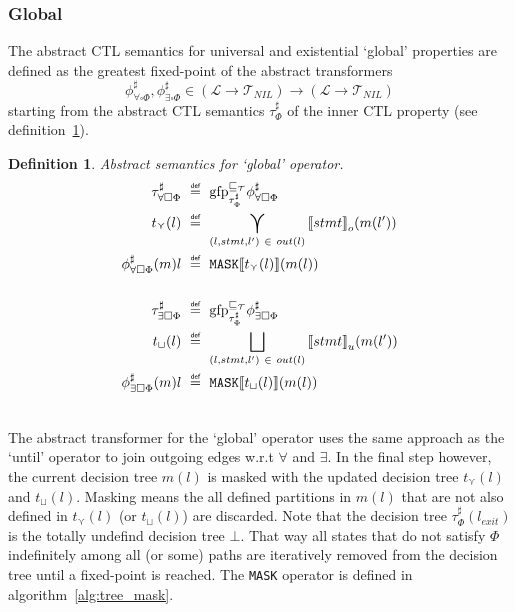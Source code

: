 \documentclass[11pt,a4paper,titlepage]{article}
\newtheorem{definition}{Definition}[section]
\newcommand\eqdef{\mathrel{\overset{\makebox[0pt]{\mbox{\normalfont\tiny\sffamily def}}}{=}}}
\begin{document}
\subsubsection*{Global}
The abstract CTL semantics for universal and existential `global' properties are defined as the greatest fixed-point of the abstract transformers
\[
    \phi^\sharp_{\forall\square\Phi}, \phi^\sharp_{\exists\square\Phi} 
\in (\mathcal{L} \rightarrow \mathcal{T}_{NIL}) \rightarrow (\mathcal{L} \rightarrow \mathcal{T}_{NIL})
\]
starting from the abstract CTL semantics $\tau^\sharp_\Phi$ of the inner CTL property (see definition~\ref{def:abstract_global_semantics}).

\begin{definition}\label{def:abstract_global_semantics}
    Abstract semantics for `global' operator.
    \setlength{\jot}{15pt}
    \begin{align*}
        \tau^\sharp_{\forall\square\Phi} \ &\eqdef \ \text{gfp}^{\sqsubseteq_{\mathcal{T}}}_{\tau^\sharp_\Phi} \phi^\sharp_{\forall\square\Phi}\\
        t_{\curlyvee}(l)  \ &\eqdef \ \bigcurlyvee\limits_{(l, stmt, l') \ \in \ out(l) } {\llbracket stmt \rrbracket}_{o} ( m(l')) \\
        \phi^\sharp_{\forall\square\Phi}(m)l \ &\eqdef \ \mathtt{MASK}\llbracket t_{\curlyvee}(l)\rrbracket (m(l))  \\\\
        \tau^\sharp_{\exists\square\Phi} \ &\eqdef \ \text{gfp}^{\sqsubseteq_{\mathcal{T}}}_{\tau^\sharp_\Phi} \phi^\sharp_{\exists\square\Phi}\\
        t_{\sqcup}(l)  \ &\eqdef \ \bigsqcup\limits_{(l, stmt, l') \ \in \ out(l) } {\llbracket stmt \rrbracket}_{u} ( m(l')) \\
        \phi^\sharp_{\exists\square\Phi}(m)l \ &\eqdef \ \mathtt{MASK}\llbracket t_{\sqcup}(l) \rrbracket (m(l))  \\\\
    \end{align*}
\end{definition}

The abstract transformer for the `global' operator uses the same approach as the `until' operator to join outgoing edges w.r.t $\forall$ and $\exists$.
In the final step however, the current decision tree $m(l)$ is masked with the updated decision tree $t_{\curlyvee}(l)$ and $t_{\sqcup}(l)$.
Masking means the all defined partitions in $m(l)$ that are not also defined in $t_{\curlyvee}(l)$ (or $t_{\sqcup}(l)$) are discarded. 
Note that the decision tree $\tau^\sharp_\Phi(l_{exit})$ is the totally undefind decision tree $\bot$.
That way all states that do not satisfy $\Phi$ indefinitely among all (or some) paths are iteratively 
removed from the decision tree until a fixed-point is reached. 
The \texttt{MASK} operator is defined in algorithm~\ref{alg:tree_mask}.
\end{document}

